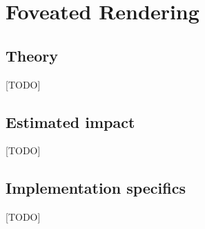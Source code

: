 
\section{Foveated Rendering}
\subsection{Theory}
[TODO]
\subsection{Estimated impact}
[TODO]
\subsection{Implementation specifics}
[TODO]
